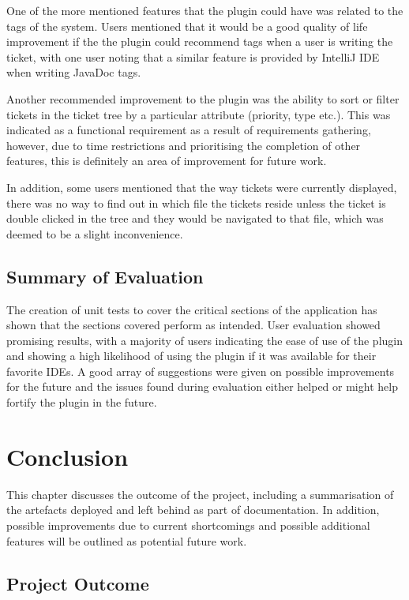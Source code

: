 \documentclass{4thYearProject}
\begin{document}
One of the more mentioned features that the plugin could have was related to the tags of the system. Users mentioned that it would be a good quality of life improvement if the the plugin could recommend tags when a user is writing the ticket, with one user noting that a similar feature is provided by IntelliJ IDE when writing JavaDoc tags.

Another recommended improvement to the plugin was the ability to sort or filter tickets in the ticket tree by a particular attribute (priority, type etc.). This was indicated as a functional requirement as a result of requirements gathering, however, due to time restrictions and prioritising the completion of other features, this is definitely an area of improvement for future work. 

In addition, some users mentioned that the way tickets were currently displayed, there was no way to find out in which file the tickets reside unless the ticket is double clicked in the tree and they would be navigated to that file, which was deemed to be a slight inconvenience. 

\section{Summary of Evaluation}

The creation of unit tests to cover the critical sections of the application has shown that the sections covered perform as intended. User evaluation showed promising results, with a majority of users indicating the ease of use of the plugin and showing a high likelihood of using the plugin if it was available for their favorite IDEs. A good array of suggestions were given on possible improvements for the future and the issues found during evaluation either helped or might help fortify the plugin in the future. 

\chapter{Conclusion}

This chapter discusses the outcome of the project, including a summarisation of the artefacts deployed and left behind as part of documentation. In addition, possible improvements due to current shortcomings and possible additional features will be outlined as potential future work. 

\section{Project Outcome}
\end{document}
